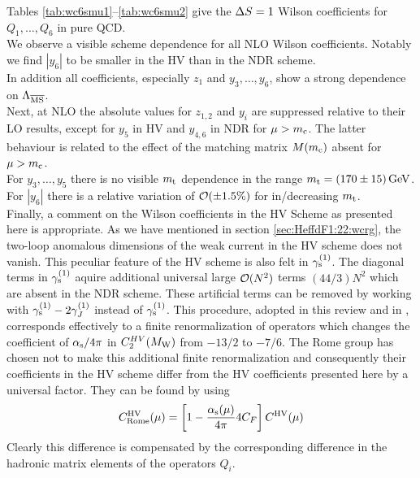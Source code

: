 Tables \ref{tab:wc6smu1}--\ref{tab:wc6smu2} give the $\Delta S=1$ Wilson
coefficients for $Q_1,\ldots,Q_6$ in pure QCD.
\\
We observe a visible scheme dependence for all NLO Wilson coefficients.
Notably we find $|y_6|$ to be smaller in the HV than in the NDR scheme.
\\
In addition all coefficients, especially $z_1$ and $y_3,\ldots,y_6$,
show a strong dependence on $\Lambda_{\overline{\rm MS}}$.
\\
Next, at NLO the absolute values for $z_{1,2}$ and $y_i$ are suppressed
relative to their LO results, except for $y_5$ in HV and $y_{4,6}$ in
NDR for $\mu > m_{\rm c}$. The latter behaviour is related to the effect of
the matching matrix $M(m_{\rm c})$ absent for $\mu > m_{\rm c}$.
\\
For $y_3,\ldots,y_5$ there is no visible $m_{\rm t}$ dependence in the range
$m_{\rm t} = (170 \pm 15)\, {\rm GeV}$. For $|y_6|$ there is a relative variation of
${\cal O}(\pm 1.5\%)$ for in/decreasing $m_{\rm t}$.
\\
Finally, a comment on the Wilson coefficients in the HV Scheme as
presented here is appropriate. As we have mentioned in section
\ref{sec:HeffdF1:22:wcrg}, the two-loop anomalous dimensions of the
weak current in the HV scheme does not vanish. This peculiar feature of
the HV scheme is also felt in $\gamma_{\rm s}^{(1)}$.  The diagonal terms in $\gamma_{\rm s}^{(1)}$
aquire additional universal large ${\cal O}(N^2)$ terms $(44/3)N^2$
which are absent in the NDR scheme. These artificial terms can be
removed by working with $\gamma_{\rm s}^{(1)} -2 \gamma^{(1)}_J$ instead of $\gamma_{\rm s}^{(1)}$.
This procedure, adopted in this review and in \cite{burasetal:92d},
corresponds effectively to a finite renormalization of operators which
changes the coefficient of $\alpha_{\rm s}/4\pi$ in $C^{HV}_2(M_{\rm W})$ from $- 13/2$
to $- 7/6$. The Rome group \cite{ciuchini:93} has chosen not to make
this additional finite renormalization and consequently their
coefficients in the HV scheme differ from the HV coefficients presented
here by a universal factor. They can be found by using
\begin{equation}
C^{\rm HV}_{\rm Rome}(\mu) =
\left[ 1 -\frac{\alpha_{\rm s}(\mu)}{4\pi} 4 C_F \right]
C^{\rm HV}(\mu)
\label{eq:Crome}
\end{equation}
Clearly this difference is compensated by the corresponding difference in the
hadronic matrix elements of the operators $Q_i$.  

